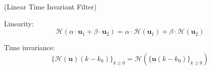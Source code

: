 	\begin{thdef} (Linear Time Invariant Filter)

		Linearity:
		$$ \mathcal{H}(\alpha \cdot \boldsymbol{u}_1+ \beta \cdot \boldsymbol{u}_2)= \alpha\cdot\mathcal{H}(\boldsymbol{u}_1) +  \beta\cdot\mathcal{H}(\boldsymbol{u}_2)$$

		Time invariance:
		$$ \{\mathcal{H}(\boldsymbol{u})(k-k_0)\}_{k\geq0} = \mathcal{H}(\{\boldsymbol{u}(k-k_0)\}_{k \geq 0} ) $$
	\end{thdef}


